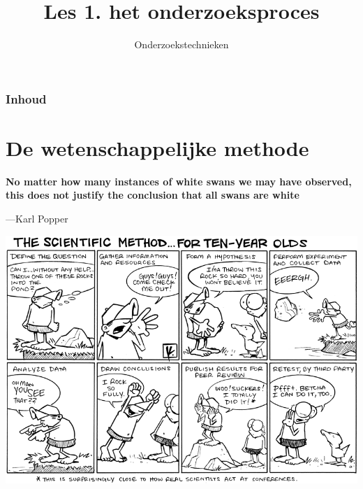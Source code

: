 \documentclass[aspectratio=169]{beamer}
\title[OZT: onderzoeksproces]{Les 1. het onderzoeksproces}
\subtitle{Onderzoekstechnieken}
\begin{document}

\begin{frame}
  \maketitle
\end{frame}


\begin{frame}
  \frametitle{Inhoud}

  \tableofcontents
\end{frame}

\section{De wetenschappelijke methode}

\begin{frame}[plain]
  \bfseries\Large
  No matter how many instances of white swans we may have observed, this does not justify the conclusion that all swans are white
  
  \bigskip
  
  ---Karl Popper
\end{frame}

\begin{frame}[plain]
  \centering
  \includegraphics[height=\textheight]{img/les1-01}
\end{frame}
\end{document}

